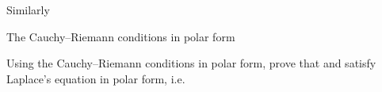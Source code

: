 
Similarly


\begin{EMimportant}{The Cauchy--Riemann conditions in polar form}


\end{EMimportant}

\begin{EMexercise}{}

Using the Cauchy--Riemann conditions in polar form, prove that  and  satisfy Laplace's equation in polar form, i.e.

\end{EMexercise}
